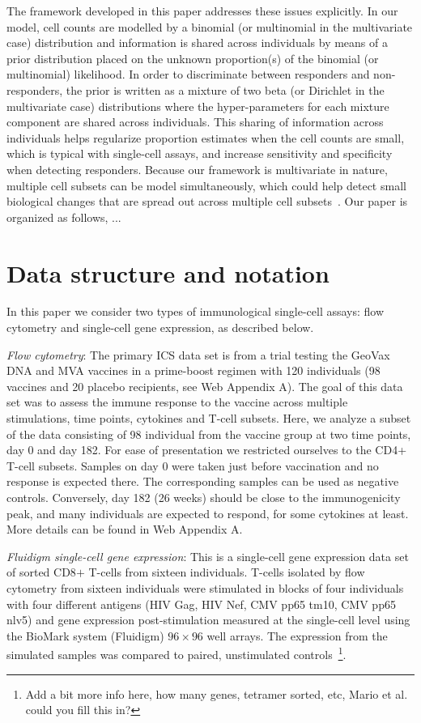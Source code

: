 \documentclass[useAMS,referee,usenatbib]{biom}
\begin{document}
The framework developed in this paper addresses these issues explicitly. In our model, cell counts are modelled by a binomial (or multinomial in the multivariate case) distribution and information is shared across individuals by means of a prior distribution placed on the unknown proportion(s) of the binomial (or multinomial) likelihood. 
In order to discriminate between responders and non-responders, the prior is written as a mixture of two beta (or Dirichlet in the multivariate case) distributions where the hyper-parameters for each mixture component are shared across individuals. 
This sharing of information across individuals helps regularize proportion estimates when the cell counts are small, which is typical with single-cell assays, and increase sensitivity and specificity when detecting responders. 
Because our framework is multivariate in nature, multiple cell subsets can be model simultaneously, which could help detect small biological changes that are spread out across multiple cell subsets~\citep{Nason:2006dx}. Our paper is organized as follows, ...

\section{Data structure and notation} 
\label{s:data}
In this paper we consider two types of immunological single-cell assays: flow cytometry and single-cell gene expression, as described below.

\textit{Flow cytometry}:
The primary ICS data set is from a  trial testing the GeoVax DNA and MVA vaccines in a prime-boost regimen with 120 individuals (98 vaccines and 20 placebo recipients, see Web Appendix A). 
The goal of this data set was to assess the immune response to the vaccine across multiple stimulations, time points, cytokines and T-cell subsets. 
Here, we analyze a subset of the data consisting of 98 individual from the vaccine group at two time points, day 0 and day 182. For ease of presentation we restricted ourselves to the CD4+ T-cell subsets. Samples on day 0 were taken just before vaccination and no response is expected there. The corresponding samples can be used as negative controls. 
Conversely, day 182 (26 weeks) should be close to the immunogenicity peak, and many individuals are expected to respond, for some cytokines at least. More details can be found in Web Appendix A.

\textit{Fluidigm single-cell gene expression}: This is a single-cell gene expression data set of sorted CD8$+$ T-cells from sixteen individuals. T-cells isolated by flow cytometry from sixteen individuals were stimulated in blocks of four individuals with four different antigens (HIV Gag, HIV Nef, CMV pp65 tm10, CMV pp65 nlv5) and gene expression post-stimulation measured at the single-cell level using the BioMark system (Fluidigm) $96 \times 96$ well arrays. The expression from the simulated samples  was compared to paired, unstimulated controls~\footnote{Add a bit more info here, how many genes, tetramer sorted, etc, Mario et al. could you fill this in?}.
\end{document}
